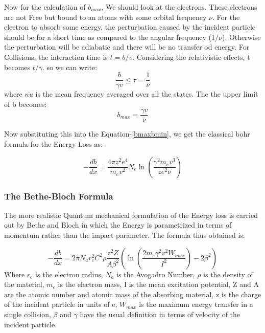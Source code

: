 \documentclass{article}
\begin{document}
\begin{multicols}{2}
Now for the calculation of $b_{max}$, We should look at the electrons. These electrons are not Free but bound to an atoms with some
orbital frequency $\nu$. For the electron to absorb some energy, the perturbation caused by the incident particle 
should be for a short time as compared to the angular frequency (1/$\nu$). Otherwise the perturbation 
will be adiabatic and there will be no transfer od energy. For Collisions, the interaction time is $t=b/v$. Considering the
relativistic effects, t becomes $t/\gamma$. so we can write:
\begin{equation}
    \frac{b}{\gamma v} \le \tau = \frac{1}{\bar{\nu}}
\end{equation}
where $\bar{nu}$ is the mean frequency averaged over all the states. The the upper limit of b becomes:
\begin{equation}
    b_{max} = \frac{\gamma v}{\bar{\nu}}
\end{equation}

Now substituting this into the Equation-\ref{bmaxbmin}, we get the classical bohr formula for the Energy Loss as:-\cite{leo1988techniques}

\begin{equation}
    -\frac{db}{dx} = \frac{4\pi z^2 e^4}{m_e v^2}N_e \ln{(\frac{\gamma^2 m_e v^3}{z e^2 \bar{\nu}})}
    \label{classicalbohr}
\end{equation}



\subsubsection{The Bethe-Bloch Formula}


The more realistic Quantum mechanical formulation of the Energy loss is carried out by
Bethe and Bloch in which the Energy is parametrized in terms of momentum rather than
the impact parameter. The formula thus obtained is:

\begin{equation}
    -\frac{db}{dx} = 2 \pi N_a r_e^2 C^2 \rho \frac{z^2 Z}{A \beta^2} (\ln{(\frac{2 m_e \gamma^2 v^2 W_{max}}{I^2})}-2\beta^2)
\end{equation}
Where $r_e$ is the electron radius, $N_a$ is the Avogadro Number, $\rho$ is the density of the material,
$m_e$ is the electron mass, I is the mean excitation potential, Z and A are the atomic
number and atomic mass of the absorbing material, z is the charge of the incident particle in units of e,
$W_{max}$ is the maximum energy transfer in a single collision, $\beta$ and $\gamma$ have the usual
definition in terms of velocity of the incident particle.


\end{multicols}
\end{document}
